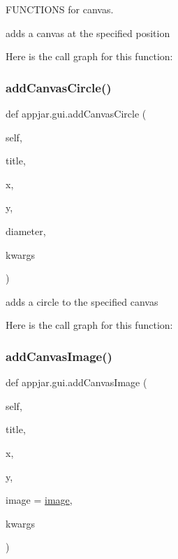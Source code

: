 F\+U\+N\+C\+T\+I\+O\+NS for canvas. 

\begin{DoxyVerb}adds a canvas at the specified position \end{DoxyVerb}
 Here is the call graph for this function\+:
\mbox{\label{classappjar_1_1gui_abaf6dd085826e9e63377faf7e305bd2b}} 
\subsubsection{\texorpdfstring{add\+Canvas\+Circle()}{addCanvasCircle()}}
{\footnotesize\ttfamily def appjar.\+gui.\+add\+Canvas\+Circle (\begin{DoxyParamCaption}\item[{}]{self,  }\item[{}]{title,  }\item[{}]{x,  }\item[{}]{y,  }\item[{}]{diameter,  }\item[{}]{kwargs }\end{DoxyParamCaption})}

\begin{DoxyVerb}adds a circle to the specified canvas \end{DoxyVerb}
 Here is the call graph for this function\+:
\mbox{\label{classappjar_1_1gui_ab9238a001df0ce23b2802099be4d01d1}} 
\subsubsection{\texorpdfstring{add\+Canvas\+Image()}{addCanvasImage()}}
{\footnotesize\ttfamily def appjar.\+gui.\+add\+Canvas\+Image (\begin{DoxyParamCaption}\item[{}]{self,  }\item[{}]{title,  }\item[{}]{x,  }\item[{}]{y,  }\item[{}]{image = {\ttfamily \hyperlink{classappjar_1_1gui_a7bf059e8a509826c130aacb56902d593}{image}},  }\item[{}]{kwargs }\end{DoxyParamCaption})}

